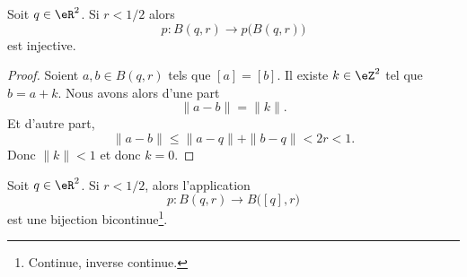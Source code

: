 \begin{lemma}	\label{LEMooGUUCooWujZAv}
	Soit \( q\in \eR^2\). Si \( r<1/2\) alors
	\begin{equation}
		p \colon B(q,r)\to  p\big( B(q,r) \big)
	\end{equation}
	est injective.
\end{lemma}

\begin{proof}
	Soient \( a,b\in B(q,r)\) tels que \( [a]=[b]\). Il existe \( k\in \eZ^2\) tel que \( b=a+k\). Nous avons alors d'une part
	\begin{equation}
		\| a-b \|=\| k \|.
	\end{equation}
	Et d'autre part,
	\begin{equation}
		\| a-b \|\leq \| a-q \|+\| b-q \|<2r<1.
	\end{equation}
	Donc \( \| k \|<1\) et donc \( k=0\).
\end{proof}

\begin{proposition}	\label{PROPooUENHooYsXspd}
	Soit \( q\in \eR^2\). Si \( r<1/2\), alors l'application
	\begin{equation}
		p \colon B(q,r)\to B\big( [q],r \big)
	\end{equation}
	est une bijection bicontinue\footnote{Continue, inverse continue.}.
\end{proposition}

